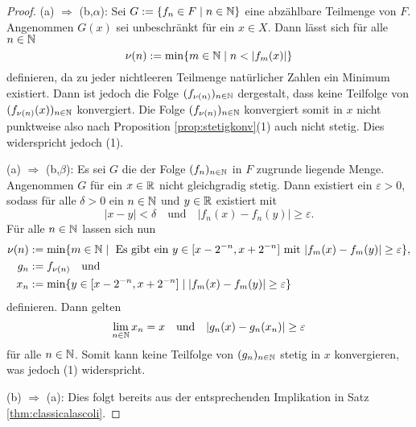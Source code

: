 \begin{proof}
  (a) $\Rightarrow$ (b,$\alpha$):
  Sei $G := \{f_n \in F \mid n \in \mathbb{N}\}$ eine abzählbare Teilmenge von $F$.
  Angenommen $G(x)$ sei unbeschränkt für ein $x \in X$.
  Dann lässt sich für alle $n \in \mathbb{N}$
  \begin{displaymath}
    \nu(n) := \min \{ m \in \mathbb{N} \mid n < |f_m(x)| \}
  \end{displaymath}
  definieren, da zu jeder nichtleeren Teilmenge natürlicher Zahlen ein Minimum existiert.
  Dann ist jedoch die Folge $(f_{\nu(n)})_{n \in \mathbb{N}}$ dergestalt, dass keine Teilfolge von $(f_{\nu(n)}(x))_{n \in \mathbb{N}}$ konvergiert.
  Die Folge $(f_{\nu(n)})_{n \in \mathbb{N}}$ konvergiert somit in $x$ nicht punktweise also nach Proposition \ref{prop:stetigkonv}(1) auch nicht stetig.
  Dies widerspricht jedoch (1).

  (a) $\Rightarrow$ (b,$\beta$):
  Es sei $G$ die der Folge $(f_n)_{n \in \mathbb{N}}$ in $F$ zugrunde liegende Menge.
  Angenommen $G$ für ein $x \in \mathbb{R}$ nicht gleichgradig stetig.
  Dann existiert ein $\varepsilon > 0$, sodass für alle $\delta > 0$ ein $n \in \mathbb{N}$ und $y \in \mathbb{R}$ existiert mit
  \begin{displaymath}
     |x - y| < \delta \quad\text{und}\quad |f_n(x) - f_n(y)| \geq \varepsilon.
  \end{displaymath}
  Für alle $n \in \mathbb{N}$ lassen sich nun
  \begin{align*}
    \nu(n) &:= \min \{ m \in \mathbb{N} \mid \text{ Es gibt ein } y \in [x - 2^{-n}, x + 2^{-n}] \text{ mit } |f_m(x) - f_m(y)| \geq \varepsilon\}, \\
    g_n &:= f_{\nu(n)} \quad\text{und}\\
    x_n &:= \min\{ y \in [x - 2^{-n}, x + 2^{-n}] \mid |f_m(x) - f_m(y)| \geq \varepsilon \}
  \end{align*}
  definieren.
  Dann gelten
  \begin{displaymath}
    \lim_{n \in \mathbb{N}} x_n = x \quad\text{und}\quad|g_n(x) - g_n(x_n)| \geq \varepsilon
  \end{displaymath}
  für alle $n \in \mathbb{N}$.
  Somit kann keine Teilfolge von $(g_n)_{n \in \mathbb{N}}$ stetig in $x$ konvergieren, was jedoch (1) widerspricht.

  (b) $\Rightarrow$ (a):
  Dies folgt bereits aus der entsprechenden Implikation in Satz \ref{thm:classicalascoli}.
\end{proof}
